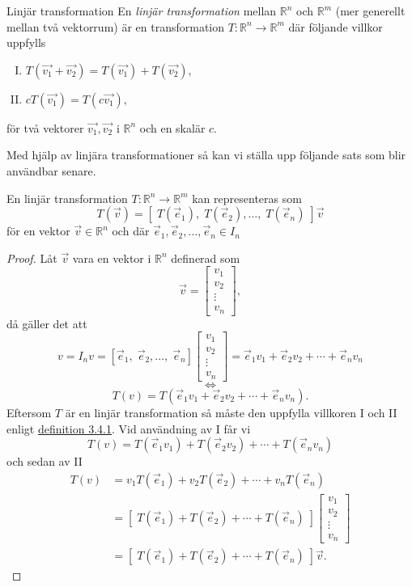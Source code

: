 \documentclass{article}
\theoremstyle{definition}
\begin{document}
\hypertarget{linjarT}{}
\begin{mydef}{Linjär transformation}{}
  En \textit{linjär transformation} mellan $\mathbb{R}^n$ och $\mathbb{R}^m$ (mer generellt
  mellan två vektorrum) är en transformation $T: \mathbb{R}^n \rightarrow \mathbb{R}^m$
  där följande villkor uppfylls
  \begin{enumerate}[I.]
    \item $T(\vec{v_1} + \vec{v_2}) = T(\vec{v_1}) + T(\vec{v_2}),$
    \item $cT(\vec{v_1}) = T(c \vec{v_1}),$
  \end{enumerate}
  för två vektorer $\vec{v_1}, \vec{v_2}$ 
     i $\mathbb{R}^n$ och en skalär $c.$
\end{mydef}
Med hjälp av linjära transformationer så kan vi ställa upp följande sats som blir användbar senare. 

\hypertarget{linjarTsats}{}
\begin{mytheo}{}{}
  En linjär transformation $T: \mathbb{R}^n \rightarrow \mathbb{R}^m$ kan representeras 
  som 
  \[T(\vec{v}) = [ \; T(\vec{e}_1), \; T(\vec{e}_2), \ldots, \; T(\vec{e}_n) \;] \vec{v}\]
  för en vektor $\vec{v} \in \mathbb{R}^n$ och där $\vec{e}_1, \vec{e}_2, \ldots, \vec{e}_n \in I_n$
\end{mytheo}
\begin{proof}
  Låt $\vec{v}$ vara en vektor i $\mathbb{R}^n$ definerad som
  \[\vec{v} = 
  \begin{bmatrix}
    v_1 \\
    v_2 \\
    \vdots \\
    v_n
  \end{bmatrix},
  \]
  då gäller det att 
  \[
    v = I_n v = [\vec{e}_1, \; \vec{e}_2, \ldots, \; \vec{e}_n] 
    \begin{bmatrix}
      v_1 \\
      v_2 \\
      \vdots \\
      v_n
    \end{bmatrix} = \vec{e}_1 v_1 + \vec{e}_2 v_2 + \cdots + \vec{e}_n v_n 
  \]
  \[\iff\]
  \[
    T(v) = T(\vec{e}_1 v_1 + \vec{e}_2 v_2 + \cdots + \vec{e}_n v_n).
  \]
    Eftersom $T$ är en linjär transformation så måste den uppfylla villkoren I och II enligt
  \hyperlink{linjarT}{definition 3.4.1}. Vid användning av I får vi 
  \[T(v) = T(\vec{e}_1 v_1) + T(\vec{e}_2 v_2) + \cdots + T(\vec{e}_n v_n)\]
  och sedan av II
  \begin{align*}
    T(v) &= v_1 T(\vec{e}_1) + v_2 T(\vec{e}_2) + \cdots + v_n T(\vec{e}_n) \\
    &= [ \; T(\vec{e}_1) +  T(\vec{e}_2) + \cdots +  T(\vec{e}_n) \;]
    \begin{bmatrix}
      v_1 \\
      v_2 \\
      \vdots \\
      v_n
    \end{bmatrix} \\
    &=  [ \; T(\vec{e}_1) +  T(\vec{e}_2) + \cdots +  T(\vec{e}_n) \;] \vec{v}.
  \end{align*}
\end{proof}
\end{document}

